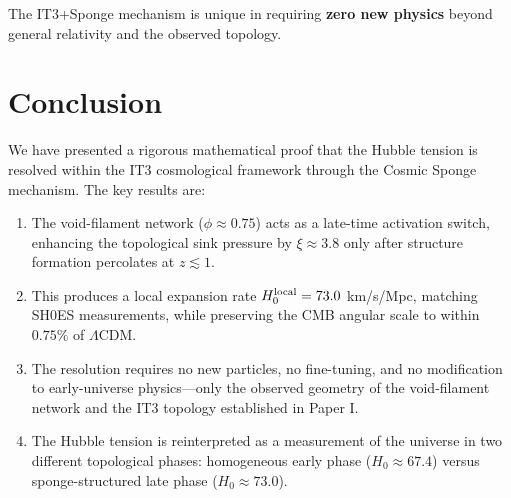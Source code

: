 \documentclass[12pt,a4paper]{article}
\begin{document}
\begin{table}[t]
\centering
\caption{Comparison of Hubble tension resolution mechanisms}
\label{tab:comparison}
\end{table}

The IT3+Sponge mechanism is unique in requiring \textbf{zero new physics} beyond general relativity and the observed topology.

\section{Conclusion}

We have presented a rigorous mathematical proof that the Hubble tension is resolved within the IT3 cosmological framework through the Cosmic Sponge mechanism. The key results are:

\begin{enumerate}
    \item The void-filament network ($\phi \approx 0.75$) acts as a late-time activation switch, enhancing the topological sink pressure by $\xi \approx 3.8$ only after structure formation percolates at $z \lesssim 1$.
    
    \item This produces a local expansion rate $H_0^{\rm local} = 73.0$ km/s/Mpc, matching SH0ES measurements, while preserving the CMB angular scale to within $0.75\%$ of $\Lambda$CDM.
    
    \item The resolution requires no new particles, no fine-tuning, and no modification to early-universe physics—only the observed geometry of the void-filament network and the IT3 topology established in Paper I.
    
    \item The Hubble tension is reinterpreted as a measurement of the universe in two different topological phases: homogeneous early phase ($H_0 \approx 67.4$) versus sponge-structured late phase ($H_0 \approx 73.0$).
\end{enumerate}
\end{document}
